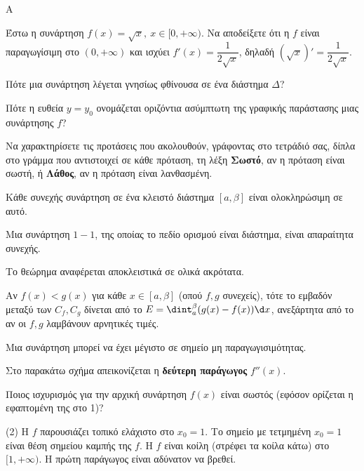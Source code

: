 \begin{thema}{A}
\begin{erwthma}
    \item {Έστω η συνάρτηση $ f(x)=\sqrt{x},\ x\in[0,+\infty) $. Να αποδείξετε ότι η $ f $ είναι παραγωγίσιμη στο $ (0,+\infty) $ και ισχύει $ f'(x)=\dfrac{1}{2\sqrt{x}} $, δηλαδή $ \left(\sqrt{x}\right)'=\dfrac{1}{2\sqrt{x}} $.}
    \item Πότε μια συνάρτηση λέγεται γνησίως φθίνουσα σε ένα διάστημα $\Delta$?
    \item Πότε η ευθεία $y=y_0$ ονομάζεται οριζόντια ασύμπτωτη της γραφικής παράστασης μιας συνάρτησης $f$?
    \item Να χαρακτηρίσετε τις προτάσεις που ακολουθούν, γράφοντας στο τετράδιό σας, δίπλα στο γράμμα που αντιστοιχεί σε κάθε πρόταση, τη λέξη \textbf{Σωστό}, αν η πρόταση είναι σωστή, ή \textbf{Λάθος}, αν η πρόταση είναι λανθασμένη.
    \begin{alist}
        \item Κάθε συνεχής συνάρτηση σε ένα κλειστό διάστημα $[a, \beta]$ είναι ολοκληρώσιμη σε αυτό.
        \item Μια συνάρτηση $1-1$, της οποίας το πεδίο ορισμού είναι διάστημα, είναι απαραίτητα συνεχής.
        \item Το θεώρημα {} αναφέρεται αποκλειστικά σε ολικά ακρότατα.
        \item Αν $f(x)<g(x)$ για κάθε $x \in [a, \beta]$ (οπού $f,g$ συνεχείς), τότε το εμβαδόν μεταξύ των $C_f, C_g$ δίνεται από το $E = \dint_a^\beta (g(x)-f(x))\d x$, ανεξάρτητα από το αν οι $f, g$ λαμβάνουν αρνητικές τιμές.
        \item Μια συνάρτηση μπορεί να έχει μέγιστο σε σημείο μη παραγωγισιμότητας.
    \end{alist}
    \item Στο παρακάτω σχήμα απεικονίζεται η \textbf{δεύτερη παράγωγος} $f''(x)$. 
    \begin{center}
    \end{center}
    Ποιος ισχυρισμός για την αρχική συνάρτηση $f(x)$ είναι σωστός (εφόσον ορίζεται η εφαπτομένη της στο 1)?
    \begin{tasks}[label=\let\textdexiakeraia\relax\alph*.](2)
        \task Η $f$ παρουσιάζει τοπικό ελάχιστο στο $x_0 = 1$.
        \task Το σημείο με τετμημένη $x_0 = 1$ είναι θέση σημείου καμπής της $f$.
        \task Η $f$ είναι κοίλη (στρέφει τα κοίλα κάτω) στο $[1, +\infty)$.
        \task Η πρώτη παράγωγος είναι αδύνατον να βρεθεί.
    \end{tasks}
\end{erwthma}
\end{thema}
